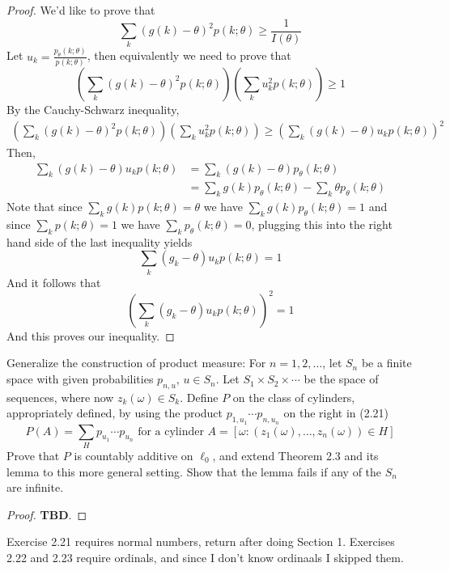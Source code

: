\documentclass[11pt]{article}
\newcommand{\om}{\omega}
\newenvironment{exercise}[2][Exercise]{\begin{trivlist}
\item[\hskip \labelsep {\bfseries #1}\hskip \labelsep {\bfseries #2.}]}{\end{trivlist}}
\begin{document}
\begin{proof}
    We'd like to prove that
    \[ \sum_{k} (g(k) - \theta)^2 p(k; \theta) \geq \frac{1}{I(\theta)} \]
    Let $u_k = \frac{p_{\theta} (k; \theta)}{p(k; \theta)}$, then equivalently we need to prove that
    \[ \left (\sum_{k} (g(k) - \theta)^2 p(k; \theta) \right ) \left (\sum_k u_k^2 p(k; \theta) \right ) \geq 1 \]
    By the Cauchy-Schwarz inequality,
    \begin{align*}
        \left (\sum_{k} (g(k) - \theta)^2 p(k; \theta) \right ) \left (\sum_k u_k^2 p(k; \theta) \right ) \geq \left (\sum_{k} (g(k) - \theta) u_k p(k; \theta) \right)^2
    \end{align*}
    Then,
    \begin{align*}
        \sum_{k} (g(k) - \theta) u_k p(k; \theta) &= \sum_{k} (g(k) - \theta) p_{\theta} (k; \theta) \\
        &= \sum_k g(k) p_{\theta} (k; \theta) - \sum_{k} \theta p_{\theta} (k; \theta)
    \end{align*}
    Note that since $\sum_k g(k) p(k; \theta) = \theta$ we have $\sum_k g(k) p_\theta (k;\theta) = 1$ and since $\sum_k p(k; \theta) = 1$ we have $\sum_k p_{\theta} (k; \theta) = 0$, plugging this into the right hand side of the last inequality yields
    \[ \sum_k (g_k - \theta) u_k p(k;\theta) = 1 \]
    And it follows that 
    \[ \left (\sum_k (g_k - \theta) u_k p(k; \theta) \right)^2 = 1 \]
    And this proves our inequality.
\end{proof}

\begin{exercise}{2.20}
    Generalize the construction of product measure: For $n = 1, 2, \ldots$, let $S_n$ be a finite space with given probabilities $p_{n, u}$, $u \in S_n$. Let $S_1 \times S_2 \times \cdots$ be the space of sequences, where now $z_k (\om) \in S_k$. Define $P$ on the class of cylinders, appropriately defined, by using the product $p_{1, u_1} \cdots p_{n, u_n}$ on the right in (2.21)
    \[ P(A) = \sum_{H} p_{u_1} \cdots p_{u_n} \text { for a cylinder } A = [ \om : (z_1 (\om), \ldots, z_n(\om)) \in H ] \]
    Prove that $P$ is countably additive on $\ell_0$, and extend Theorem 2.3 and its lemma to this more general setting. Show that the lemma fails if any of the $S_n$ are infinite.
\end{exercise}
\begin{proof}
    \textbf{TBD}.
\end{proof}

Exercise 2.21 requires normal numbers, return after doing Section 1. Exercises 2.22 and 2.23 require ordinals, and since I don't know ordinaals I skipped them.
\end{document}
